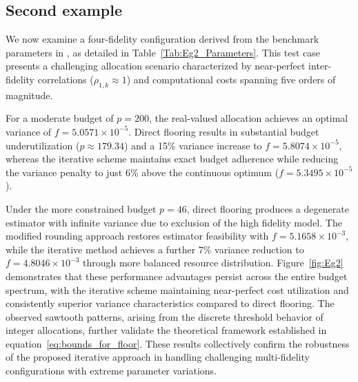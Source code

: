 \subsection{Second example}
We now examine a four-fidelity configuration derived from the benchmark parameters in \cite{PeWiGu:2016}, as detailed in Table~\ref{Tab:Eg2_Parameters}. This test case presents a challenging allocation scenario characterized by near-perfect inter-fidelity correlations ($\rho_{1,k} \approx 1$) and computational costs spanning five orders of magnitude. 

For a moderate budget of $p=200$, the real-valued allocation achieves an optimal variance of $f=5.0571\times10^{-5}$. Direct flooring results in substantial budget underutilization ($p \approx 179.34$) and a 15\% variance increase to $f=5.8074\times10^{-5}$, whereas the iterative scheme maintains exact budget adherence while reducing the variance penalty to just 6\% above the continuous optimum ($f=5.3495\times10^{-5}$). 

Under the more constrained budget $p=46$, direct flooring produces a degenerate estimator with infinite variance due to exclusion of the high fidelity model. The modified rounding approach restores estimator feasibility with $f=5.1658\times10^{-3}$, while the iterative method achieves a further 7\% variance reduction to $f=4.8046\times10^{-3}$ through more balanced resource distribution. Figure~\ref{fig:Eg2} demonstrates that these performance advantages persist across the entire budget spectrum, with the iterative scheme maintaining near-perfect cost utilization and consistently superior variance characteristics compared to direct flooring. The observed sawtooth patterns, arising from the discrete threshold behavior of integer allocations, further validate the theoretical framework established in equation~\eqref{eq:bounds_for_floor}. These results collectively confirm the robustness of the proposed iterative approach in handling challenging multi-fidelity configurations with extreme parameter variations. 


%
\begin{table}[ht]
\centering
{}
\caption{Parameters from Peherstorfer's paper \cite{PeWiGu:2016}.}
\label{Tab:Eg2_Parameters}
\end{table}
%

